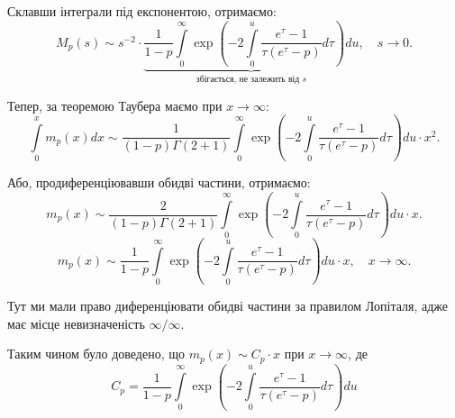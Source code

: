 Склавши інтеграли під експонентою, отримаємо:
\begin{equation}
M_p(s) \sim s^{-2} \cdot \underbrace{\frac{1}{1-p} \int\limits_0^\infty \exp\left( -2\int\limits_0^u \frac{e^{\tau} - 1}{\tau(e^\tau - p)} d\tau  \right) du}_{\text{збігається, не залежить від } s}, \quad s \rightarrow 0.
\end{equation}

Тепер, за теоремою Таубера маємо при $x \rightarrow \infty$:
\begin{equation}
\int\limits_0^x m_p(x) dx \sim \frac{1}{(1-p)\Gamma(2 + 1)} \int\limits_0^\infty \exp\left( -2\int\limits_0^u \frac{e^{\tau} - 1}{\tau(e^\tau - p)} d\tau  \right) du \cdot x^2.
\end{equation}

Або, продиференціювавши обидві частини,  отримаємо:
\begin{equation*}
m_p(x) \sim \frac{2}{(1- p) \Gamma(2 + 1)} \int\limits_0^\infty \exp\left( -2\int\limits_0^u \frac{e^{\tau} - 1}{\tau(e^\tau - p)} d\tau  \right) du \cdot x.
\end{equation*}
\begin{equation}
\label{eq:model_final}
m_p(x) \sim \frac{1}{1-p} \int\limits_0^\infty \exp\left( -2\int\limits_0^u \frac{e^{\tau} - 1}{\tau(e^\tau - p)} d\tau  \right) du \cdot x, \quad x \rightarrow \infty.
\end{equation}

Тут ми мали право диференціювати обидві частини за правилом Лопіталя, адже має місце невизначеність $\infty / \infty$.

Таким чином було доведено, що $m_{p}(x) \sim C_{p} \cdot x$ при $x \rightarrow \infty$, де
\begin{equation}
C_{p} = \frac{1}{1-p} \int\limits_0^\infty \exp\left( -2\int\limits_0^u \frac{e^{\tau} - 1}{\tau(e^\tau - p)} d\tau  \right) du
\end{equation}